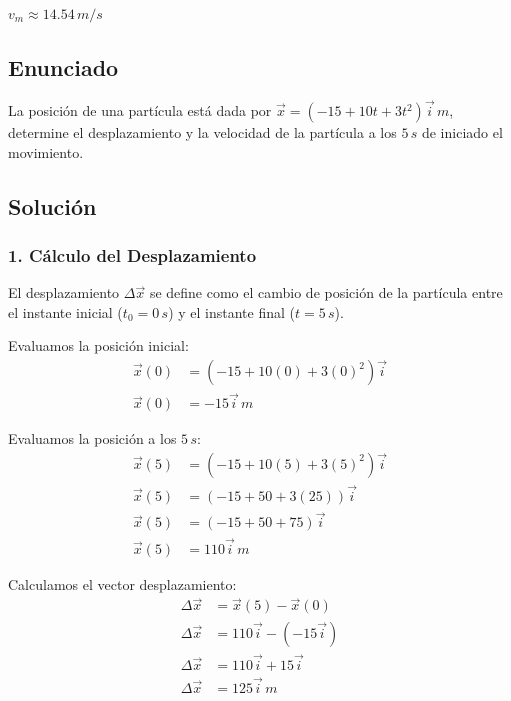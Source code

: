 \documentclass[12pt, a4paper]{article}
\begin{document}
\begin{tcolorbox}[colback=green!5!white, colframe=green!50!black, title=Respuesta Final]
\centering \Large $v_m \approx 14.54 \, \si{m/s}$
\end{tcolorbox}

\newpage

\subsection*{Enunciado}
La posición de una partícula está dada por $\vec{x} = (-15 + 10t + 3t^2)\vec{i} \, \si{m}$, determine el desplazamiento y la velocidad de la partícula a los $5 \, \si{s}$ de iniciado el movimiento.

\subsection*{Solución}

\subsubsection*{1. Cálculo del Desplazamiento}
El desplazamiento $\Delta\vec{x}$ se define como el cambio de posición de la partícula entre el instante inicial ($t_0 = 0 \, \si{s}$) y el instante final ($t = 5 \, \si{s}$).

Evaluamos la posición inicial:
\begin{align*}
\vec{x}(0) &= (-15 + 10(0) + 3(0)^2)\vec{i} \\
\vec{x}(0) &= -15\vec{i} \, \si{m}
\end{align*}

Evaluamos la posición a los $5 \, \si{s}$:
\begin{align*}
\vec{x}(5) &= (-15 + 10(5) + 3(5)^2)\vec{i} \\
\vec{x}(5) &= (-15 + 50 + 3(25))\vec{i} \\
\vec{x}(5) &= (-15 + 50 + 75)\vec{i} \\
\vec{x}(5) &= 110\vec{i} \, \si{m}
\end{align*}

Calculamos el vector desplazamiento:
\begin{align*}
\Delta\vec{x} &= \vec{x}(5) - \vec{x}(0) \\
\Delta\vec{x} &= 110\vec{i} - (-15\vec{i}) \\
\Delta\vec{x} &= 110\vec{i} + 15\vec{i} \\
\Delta\vec{x} &= 125\vec{i} \, \si{m}
\end{align*}
\end{document}
